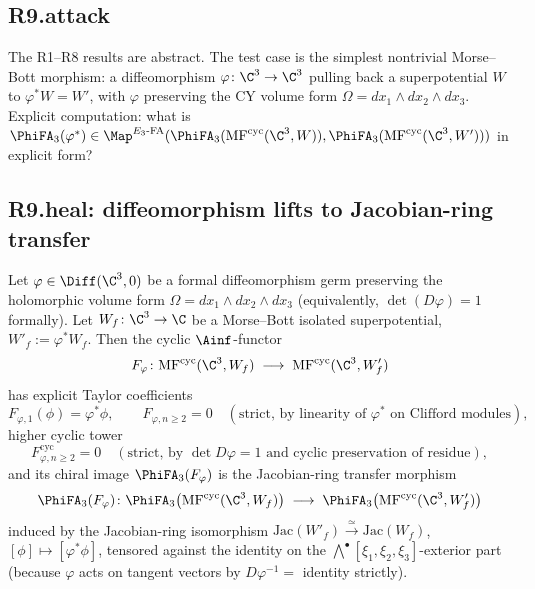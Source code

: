 \subsection*{R9.attack}

The R1--R8 results are abstract.  The test case is the simplest
nontrivial Morse--Bott morphism: a diffeomorphism $\varphi \colon \C^3
\to \C^3$ pulling back a superpotential $W$ to $\varphi^* W = W'$, with
$\varphi$ preserving the CY volume form $\Omega = dx_1 \wedge dx_2
\wedge dx_3$.  Explicit computation: what is $\PhiFA_3(\varphi^*) \in
\Map^{E_3\text{-FA}}(\PhiFA_3(\mathrm{MF}^{\mathrm{cyc}}(\C^3, W)),
\PhiFA_3(\mathrm{MF}^{\mathrm{cyc}}(\C^3, W')))$ in explicit form?

\subsection*{R9.heal: diffeomorphism lifts to Jacobian-ring transfer}

\begin{proposition}
\label{prop:explicit-diffeomorphism-functoriality}
\ClaimStatusProvedHere
Let $\varphi \in \Diff(\C^3, 0)$ be a formal diffeomorphism germ
preserving the holomorphic volume form $\Omega = dx_1 \wedge dx_2
\wedge dx_3$ (equivalently, $\det(D\varphi) = 1$ formally).  Let
$W_f \colon \C^3 \to \C$ be a Morse--Bott isolated superpotential,
$W'_f := \varphi^* W_f$.  Then the cyclic $\Ainf$-functor
\[
  F_\varphi
  \colon
  \mathrm{MF}^{\mathrm{cyc}}(\C^3, W_f)
  \;\longrightarrow\;
  \mathrm{MF}^{\mathrm{cyc}}(\C^3, W'_f)
\]
has explicit Taylor coefficients
\[
  F_{\varphi,1}(\phi) = \varphi^* \phi,
  \qquad
  F_{\varphi,n \geq 2} = 0
  \quad(\text{strict, by linearity of $\varphi^*$ on Clifford modules}),
\]
higher cyclic tower
\[
  F_{\varphi,n \geq 2}^{\mathrm{cyc}} = 0
  \quad(\text{strict, by $\det D\varphi = 1$ and cyclic preservation of residue}),
\]
and its chiral image $\PhiFA_3(F_\varphi)$ is the Jacobian-ring transfer
morphism
\[
  \PhiFA_3(F_\varphi)
  \colon
  \PhiFA_3\bigl(\mathrm{MF}^{\mathrm{cyc}}(\C^3, W_f)\bigr)
  \;\longrightarrow\;
  \PhiFA_3\bigl(\mathrm{MF}^{\mathrm{cyc}}(\C^3, W'_f)\bigr)
\]
induced by the Jacobian-ring isomorphism
$\mathrm{Jac}(W'_f) \xrightarrow{\;\simeq\;} \mathrm{Jac}(W_f)$,
$[\phi] \mapsto [\varphi^* \phi]$, tensored against the identity on the
$\bigwedge^\bullet[\xi_1, \xi_2, \xi_3]$-exterior part (because
$\varphi$ acts on tangent vectors by $D\varphi^{-1} = $ identity
strictly).
\end{proposition}

